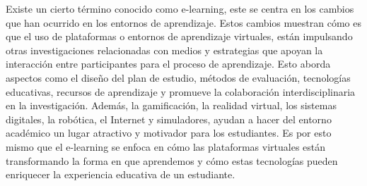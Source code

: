 Existe un cierto término conocido como e-learning, este se centra en los cambios que han ocurrido en los entornos de aprendizaje. Estos cambios muestran cómo es que el uso de plataformas o entornos de aprendizaje virtuales, están impulsando otras investigaciones relacionadas con medios y estrategias que apoyan la interacción entre participantes para el proceso de aprendizaje. Esto aborda aspectos como el diseño del plan de estudio, métodos de evaluación, tecnologías educativas, recursos de aprendizaje y promueve la colaboración interdisciplinaria en la investigación. Además, la gamificación, la realidad virtual, los sistemas digitales, la robótica, el Internet y simuladores, ayudan a hacer del entorno académico un lugar atractivo y motivador para los estudiantes. Es por esto mismo que el e-learning se enfoca en cómo las plataformas virtuales están transformando la forma en que aprendemos y cómo estas tecnologías pueden enriquecer la experiencia educativa de un estudiante. \parencite{zamudio2021realidad}
